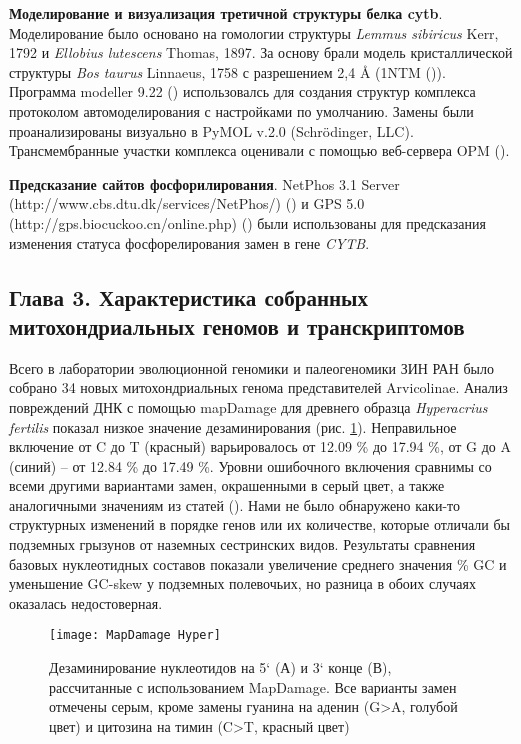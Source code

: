 \textbf{Моделирование и визуализация третичной структуры белка cytb}. Моделирование было основано на гомологии структуры \textit{Lemmus sibiricus} Kerr, 1792 и \textit{Ellobius lutescens} Thomas, 1897. За основу брали модель кристаллической структуры  \textit{Bos taurus} Linnaeus, 1758 с разрешением 2,4 Å (1NTM (\cite{Gao2003})). Программа modeller 9.22 (\cite{Webb2016}) использовалсь для создания структур комплекса протоколом автомоделирования с настройками по умолчанию. Замены были проанализированы визуально в PyMOL v.2.0 (Schrödinger, LLC). Трансмембранные участки комплекса оценивали с помощью веб-сервера OPM (\cite{Lomize2012}). 

\textbf{Предсказание сайтов фосфорилирования}. NetPhos 3.1 Server (http://www.cbs.dtu.dk/services/NetPhos/) (\cite{Blom2004}) и GPS 5.0 (http://gps.biocuckoo.cn/online.php) (\cite{Xue2011}) были использованы для предсказания изменения статуса фосфорелирования замен в гене \textit{CYTB}.


\subsection*{Глава 3. Характеристика собранных митохондриальных геномов и транскриптомов}

Всего в лаборатории эволюционной геномики и палеогеномики ЗИН РАН было собрано 34 новых митохондриальных генома представителей Arvicolinae. Анализ повреждений ДНК с помощью mapDamage для древнего образца \textit{Hyperacrius fertilis} показал низкое значение дезаминирования (рис. \ref{MapDamage}). Неправильное включение от C до T (красный) варьировалось от 12.09 \% до 17.94 \%, от G до A (синий) -- от 12.84 \% до 17.49 \%. Уровни ошибочного включения сравнимы со всеми другими вариантами замен, окрашенными в серый цвет, а также аналогичными значениям из статей (\cite{Molto2017}). Нами не было обнаружено каки-то структурных изменений в порядке генов или их количестве, которые отличали бы подземных грызунов от наземных сестринских видов. Результаты сравнения базовых нуклеотидных составов показали увеличение среднего значения \% GC и уменьшение GC-skew у подземных полевочьих, но разница в обоих случаях оказалась недостоверная.

\begin{figure}[h!]
	\begin{center}
		\texttt{[image: MapDamage Hyper]}
	\end{center}
	\caption{Дезаминирование нуклеотидов на 5` (А) и 3` конце (В), рассчитанные с использованием MapDamage. Все варианты замен отмечены серым, кроме замены гуанина на аденин (G>A, голубой цвет) и цитозина на тимин (C>T, красный цвет)}\label{MapDamage}
\end{figure}

